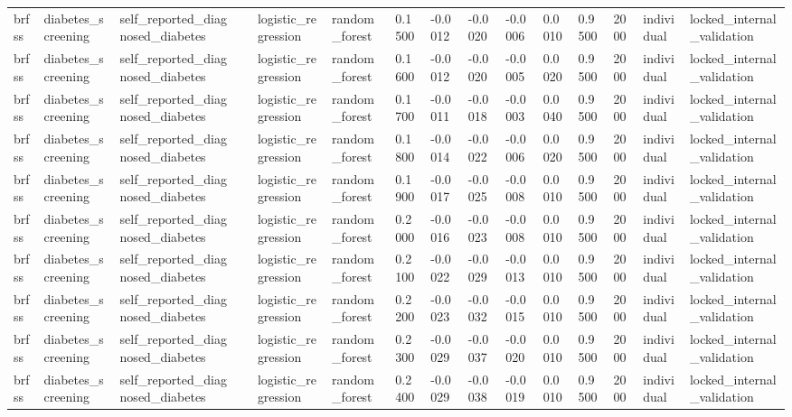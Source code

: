 \begin{tabular}{lllllllllllllll}
brfss & diabetes\_screening & self\_reported\_diagnosed\_diabetes &  & logistic\_regression & random\_forest & 0.1500 & -0.0012 & -0.0020 & -0.0006 & 0.0010 & 0.9500 & 2000 & individual & locked\_internal\_validation \\
brfss & diabetes\_screening & self\_reported\_diagnosed\_diabetes &  & logistic\_regression & random\_forest & 0.1600 & -0.0012 & -0.0020 & -0.0005 & 0.0020 & 0.9500 & 2000 & individual & locked\_internal\_validation \\
brfss & diabetes\_screening & self\_reported\_diagnosed\_diabetes &  & logistic\_regression & random\_forest & 0.1700 & -0.0011 & -0.0018 & -0.0003 & 0.0040 & 0.9500 & 2000 & individual & locked\_internal\_validation \\
brfss & diabetes\_screening & self\_reported\_diagnosed\_diabetes &  & logistic\_regression & random\_forest & 0.1800 & -0.0014 & -0.0022 & -0.0006 & 0.0020 & 0.9500 & 2000 & individual & locked\_internal\_validation \\
brfss & diabetes\_screening & self\_reported\_diagnosed\_diabetes &  & logistic\_regression & random\_forest & 0.1900 & -0.0017 & -0.0025 & -0.0008 & 0.0010 & 0.9500 & 2000 & individual & locked\_internal\_validation \\
brfss & diabetes\_screening & self\_reported\_diagnosed\_diabetes &  & logistic\_regression & random\_forest & 0.2000 & -0.0016 & -0.0023 & -0.0008 & 0.0010 & 0.9500 & 2000 & individual & locked\_internal\_validation \\
brfss & diabetes\_screening & self\_reported\_diagnosed\_diabetes &  & logistic\_regression & random\_forest & 0.2100 & -0.0022 & -0.0029 & -0.0013 & 0.0010 & 0.9500 & 2000 & individual & locked\_internal\_validation \\
brfss & diabetes\_screening & self\_reported\_diagnosed\_diabetes &  & logistic\_regression & random\_forest & 0.2200 & -0.0023 & -0.0032 & -0.0015 & 0.0010 & 0.9500 & 2000 & individual & locked\_internal\_validation \\
brfss & diabetes\_screening & self\_reported\_diagnosed\_diabetes &  & logistic\_regression & random\_forest & 0.2300 & -0.0029 & -0.0037 & -0.0020 & 0.0010 & 0.9500 & 2000 & individual & locked\_internal\_validation \\
brfss & diabetes\_screening & self\_reported\_diagnosed\_diabetes &  & logistic\_regression & random\_forest & 0.2400 & -0.0029 & -0.0038 & -0.0019 & 0.0010 & 0.9500 & 2000 & individual & locked\_internal\_validation \\

\end{tabular}
